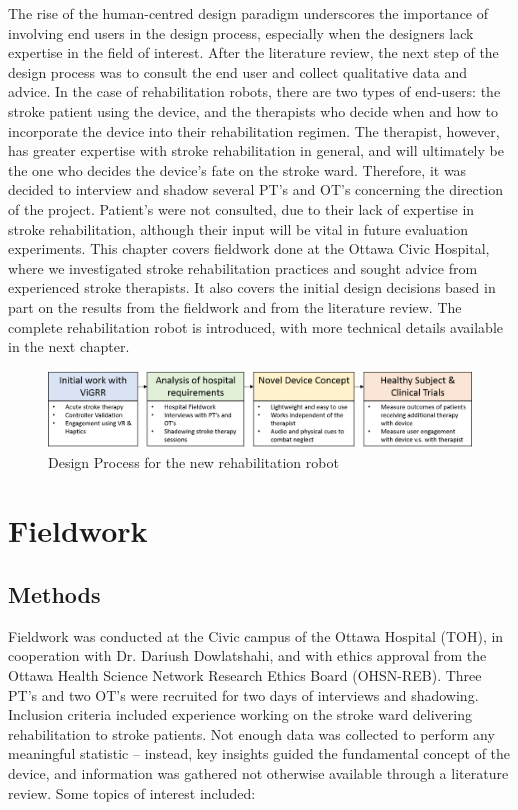 \documentclass[12pt]{report}
\begin{document}
	The rise of the human-centred design paradigm underscores the importance of involving end users in the design process, especially when the designers lack expertise in the field of interest. After the literature review, the next step of the design process was to consult the end user and collect qualitative data and advice. In the case of rehabilitation robots, there are two types of end-users: the stroke patient using the device, and the therapists who decide when and how to incorporate the device into their rehabilitation regimen. The therapist, however, has greater expertise with stroke rehabilitation in general, and will ultimately be the one who decides the device's fate on the stroke ward. Therefore, it was decided to interview and shadow several PT's and OT's concerning the direction of the project. Patient's were not consulted, due to their lack of expertise in stroke rehabilitation, although their input will be vital in future evaluation experiments.  This chapter covers fieldwork done at the Ottawa Civic Hospital, where we investigated stroke rehabilitation practices and sought advice from experienced stroke therapists. It also covers the initial design decisions based in part on the results from the fieldwork and from the literature review. The complete rehabilitation robot is introduced, with more technical details available in the next chapter.
	
		\begin{figure}[h] 
		\centering
		\includegraphics[width=\linewidth]{design_diagram}
		\caption{Design Process for the new rehabilitation robot}
		\label{fig:design_diagram}
	\end{figure}

\section{Fieldwork} 

\subsection{Methods}

	Fieldwork was conducted at the Civic campus of the Ottawa Hospital (TOH), in cooperation with Dr. Dariush Dowlatshahi, and with ethics approval from the Ottawa Health Science Network Research Ethics Board (OHSN-REB). Three PT's and two OT's were recruited for two days of interviews and shadowing. Inclusion criteria included experience working on the stroke ward delivering rehabilitation to stroke patients. Not enough data was collected to perform any meaningful statistic -- instead, key insights guided the fundamental concept of the device, and information was gathered not otherwise available through a literature review. Some topics of interest included:
	
\end{document}

